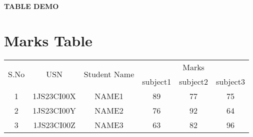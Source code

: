 \documentclass[10pt,a4paper]{article}
\begin{document}
\begin{center}
\begin{Large}
\textbf{TABLE DEMO}
\end{Large}
\end{center}
\section*{Marks Table}
\begin{tabular}{|c|c|c|c|c|c|}
	\hline
	\multirow{2}{*}{S.No} & \multirow{2}{*}{USN} & \multirow{2}{*}{Student Name} & \multicolumn{3}{c|}{Marks}\\ 
	\cline{4-6}
	&&&subject1 &subject2 &subject3\\
	\hline
	1 &1JS23CI00X &NAME1 &89&77&75\\
	\hline
	2 &1JS23CI00Y &NAME2 &76&92&64\\
	\hline
	3 &1JS23CI00Z &NAME3 &63&82&96\\
	\hline
\end{tabular}
\end{document}

